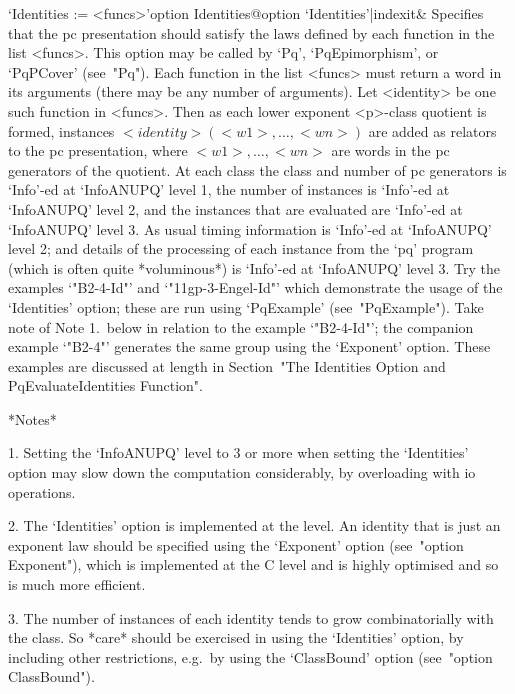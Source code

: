 \>`Identities := <funcs>'{option Identities}@{option `Identities'|indexit}&
Specifies that the pc presentation should satisfy  the  laws  defined  by
each function in the list <funcs>. This option may  be  called  by  `Pq',
`PqEpimorphism', or `PqPCover' (see~"Pq").  Each  function  in  the  list
<funcs> must return a word in its arguments (there may be any  number  of
arguments). Let <identity> be one such function in <funcs>. Then as  each
lower exponent <p>-class quotient is formed, instances  $<identity>(<w1>,
\dots, <wn>)$ are added as relators to the pc presentation, where  $<w1>,
\dots, <wn>$ are words in the pc generators  of  the  quotient.  At  each
class the class and number of pc generators is `Info'-ed  at  `InfoANUPQ'
level 1, the number of instances is `Info'-ed at `InfoANUPQ' level 2, and
the instances that are evaluated are `Info'-ed at `InfoANUPQ' level 3. As
usual timing information is `Info'-ed at `InfoANUPQ' level 2; and details
of the processing of each instance from the `pq' program (which is  often
quite *voluminous*) is `Info'-ed at `InfoANUPQ' level 3. Try the examples
`"B2-4-Id"' and `"11gp-3-Engel-Id"' which demonstrate the  usage  of  the
`Identities' option; these are run using  `PqExample'  (see~"PqExample").
Take note of Note 1.~below in relation to the  example  `"B2-4-Id"';  the
companion example `"B2-4"' generates the same group using the  `Exponent'
option. These examples are discussed at length in Section~"The Identities
Option and PqEvaluateIdentities Function".

*Notes*

\beginlist%

\item{1.}
Setting the `InfoANUPQ' level to 3 or more when setting the  `Identities'
option may slow down the computation considerably, by overloading  {\GAP}
with io operations.

\item{2.}
The `Identities' option is implemented at the {\GAP} level.  An  identity
that is just an exponent law should be  specified  using  the  `Exponent'
option (see~"option Exponent"), which is implemented at the C  level  and
is highly optimised and so is much more efficient.

\item{3.}
The  number  of   instances  of  each  identity   tends  to  grow
combinatorially with the class. So *care* should be exercised in using
the  `Identities'  option, by  including  other restrictions,  e.g.~by
using the `ClassBound' option (see~"option ClassBound").

